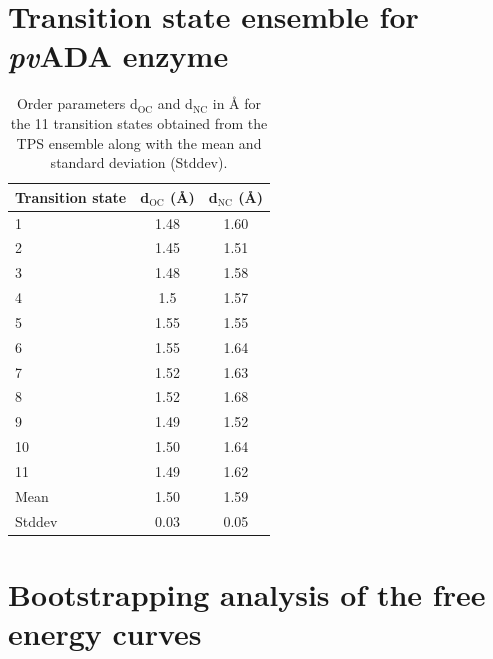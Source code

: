 \documentclass[journal=jpcbfk,manuscript=suppinfo,layout=traditional]{achemso}
\begin{document}
\section{Transition state ensemble for \textit{pv}ADA enzyme}
\begin{table}[ht!]
\caption{Order parameters d$_{\text{OC}}$ and d$_{\text{NC}}$ in {\AA} for the 11 transition states obtained from 
the TPS ensemble along with the mean and standard deviation (Stddev).}
\centering
\begin{tabular}{l c c}
\hline\hline
Transition state & d$_{\text{OC}}$ ({\AA})& d$_{\text{NC}}$ ({\AA})\\
\hline
1& 1.48  &1.60 \\
2& 1.45  &1.51 \\
3& 1.48  &1.58 \\
4& 1.5   &1.57 \\
5& 1.55  &1.55 \\
6& 1.55  &1.64 \\
7& 1.52  &1.63 \\
8& 1.52  &1.68 \\
9& 1.49  &1.52 \\
10&1.50  &1.64 \\
11&1.49  &1.62 \\
\hline
Mean & 1.50 & 1.59 \\
Stddev & 0.03 & 0.05 \\
\hline\hline
\end{tabular}
%
\end{table}

\section{Bootstrapping analysis of the free energy curves}


\end{document}
